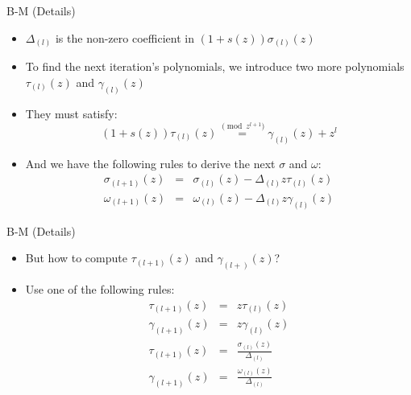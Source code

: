 \documentclass[]{prosper}
\begin{document}
\begin{slide}{B-M (Details)}
\begin{itemize}
    \item $\Delta_{(l)}$ is the non-zero coefficient in $(1 + s(z))\sigma_{(l)}(z)$
    \item To find the next iteration's polynomials, we introduce two more polynomials $\tau_{(l)}(z)$ and $\gamma_{(l)}(z)$
    \item They must satisfy:
    \[ (1 + s(z)) \tau_{(l)}(z) \stackrel{\pmod{z^{l+1}}}{=} \gamma_{(l)}(z) + z^l  \]
    \item And we have the following rules to derive the next $\sigma$ and $\omega$:
    \begin{eqnarray*}
    \sigma_{(l+1)}(z) &=& \sigma_{(l)}(z) - \Delta_{(l)}z\tau_{(l)}(z) \\
    \omega_{(l+1)}(z) &=& \omega_{(l)}(z) - \Delta_{(l)}z\gamma_{(l)}(z)
    \end{eqnarray*}
\end{itemize}
\end{slide}

\begin{slide}{B-M (Details)}
\begin{itemize}
    \item But how to compute $\tau_{(l+1)}(z)$ and $\gamma_{(l+)}(z)$?
    \item Use one of the following rules:
        \begin{align}
        \label{ruleA}
        \tau_{(l+1)}(z) &=& z\tau_{(l)}(z) \tag{A} \\
        \gamma_{(l+1)}(z) &=& z\gamma_{(l)}(z) \nonumber \\
        \label{ruleB}
        \tau_{(l+1)}(z) &=& \frac{\sigma_{(l)}(z)}{\Delta_{(l)}} \tag{B} \\
        \gamma_{(l+1)}(z) &=& \frac{\omega_{(l)}(z)}{\Delta_{(l)}} \nonumber
        \end{align}
\end{itemize}
\end{slide}
\end{document}
